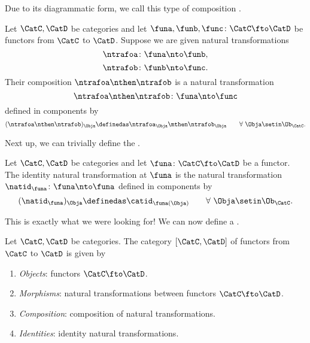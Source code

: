 
Due to its diagrammatic form, we call this type of composition .
\begin{ctdefinition}\label{def:composition-of-naturali-tranformations}
    Let $\CatC, \CatD$ be categories and let $\funa, \funb, \func \colon \CatC \fto \CatD$ be functors from $\CatC$ to $\CatD$.
    Suppose we are given natural transformations
    \begin{equation}
        \ntrafoa \colon \funa \nto \funb,
    \end{equation}
    \begin{equation}
        \ntrafob \colon \funb \nto \func.
    \end{equation}
    Their composition $\ntrafoa \nthen \ntrafob$ is a natural transformation
    \begin{equation}
        \ntrafoa \nthen \ntrafob \colon \funa \nto \func
    \end{equation}
    defined in components by
    \begin{equation}\label{eq:nat-trafo-composition}
        (\ntrafoa \nthen \ntrafob)_\Obja \definedas \ntrafoa_\Obja \mthen \ntrafob_\Obja \quad \quad \forall \ \Obja \setin \Ob_\CatC.
    \end{equation}
\end{ctdefinition}
Next up, we can trivially define the .

\begin{ctdefinition}\label{def:identity-natural-transformation}
    Let $\CatC, \CatD$ be categories and let $\funa \colon \CatC \fto \CatD$ be a functor.
    The identity natural transformation at $\funa$ is the natural transformation $\natid_\funa \colon \funa \nto \funa$ defined in components by
    \begin{equation}\label{eq:identity-nat-trafo-def}
        (\natid_\funa)_\Obja \definedas \catid_{\funa(\Obja)} \quad \quad \forall \ \Obja \setin\Ob_\CatC.
    \end{equation}
\end{ctdefinition}

This is exactly what we were looking for! We can now define a .

\begin{ctdefinition}\label{def:category-of-functors}
    Let $\CatC, \CatD$ be categories.
    The category $[\CatC, \CatD]$ of functors from $\CatC$ to $\CatD$ is given by
    \begin{enumerate}
        \item \emph{Objects}: functors $\CatC \fto \CatD$.
        \item \emph{Morphisms}: natural transformations between functors $\CatC \fto \CatD$.
        \item \emph{Composition}: composition of natural transformations.
        \item \emph{Identities}: identity natural transformations.
    \end{enumerate}
\end{ctdefinition}


